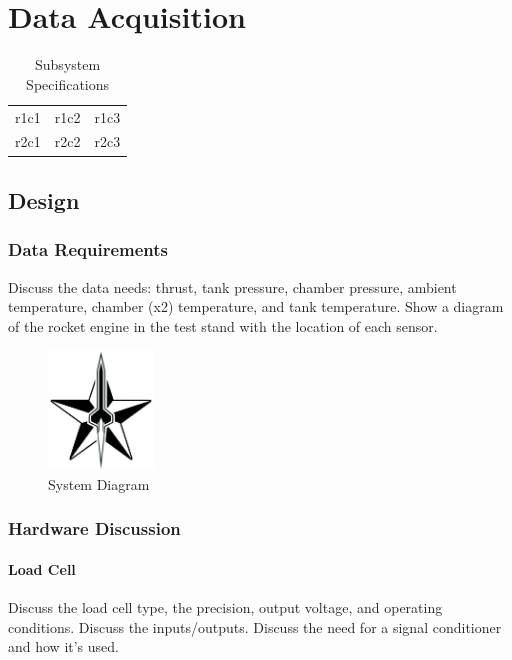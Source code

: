\documentclass[10pt,a4paper]{article}
\begin{document}
	
\section{Data Acquisition}

\begin{table}[h!]
		\centering
		\begin{tabular}{l l l}
			r1c1 & r1c2 & r1c3 \\
			r2c1 & r2c2 & r2c3 \\
		\end{tabular}
		\caption{Subsystem Specifications}
		\label{tab:example}
\end{table}

\subsection{Design}

\subsubsection{Data Requirements}

Discuss the data needs: thrust, tank pressure, chamber pressure, ambient temperature, chamber (x2) temperature, and tank temperature. Show a diagram of the rocket engine in the test stand with the location of each sensor.

\begin{figure}[h!]
	\centering
	\includegraphics[width=0.25\textwidth]{./figs/logo_srt.png}
	\caption{System Diagram}
	\label{fig:example}
\end{figure}
	
\subsubsection{Hardware Discussion}

\paragraph{Load Cell}

Discuss the load cell type, the precision, output voltage, and operating conditions. Discuss the inputs/outputs. Discuss the need for a signal conditioner and how it's used. 
\end{document}
